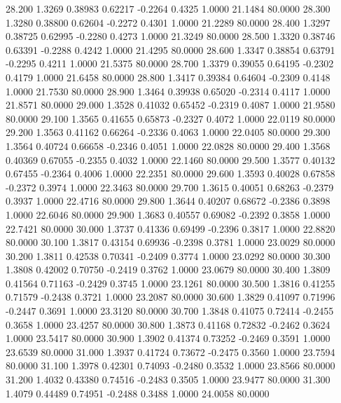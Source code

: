   28.200   1.3269   0.38983   0.62217  -0.2264   0.4325   1.0000  21.1484  80.0000
  28.300   1.3280   0.38800   0.62604  -0.2272   0.4301   1.0000  21.2289  80.0000
  28.400   1.3297   0.38725   0.62995  -0.2280   0.4273   1.0000  21.3249  80.0000
  28.500   1.3320   0.38746   0.63391  -0.2288   0.4242   1.0000  21.4295  80.0000
  28.600   1.3347   0.38854   0.63791  -0.2295   0.4211   1.0000  21.5375  80.0000
  28.700   1.3379   0.39055   0.64195  -0.2302   0.4179   1.0000  21.6458  80.0000
  28.800   1.3417   0.39384   0.64604  -0.2309   0.4148   1.0000  21.7530  80.0000
  28.900   1.3464   0.39938   0.65020  -0.2314   0.4117   1.0000  21.8571  80.0000
  29.000   1.3528   0.41032   0.65452  -0.2319   0.4087   1.0000  21.9580  80.0000
  29.100   1.3565   0.41655   0.65873  -0.2327   0.4072   1.0000  22.0119  80.0000
  29.200   1.3563   0.41162   0.66264  -0.2336   0.4063   1.0000  22.0405  80.0000
  29.300   1.3564   0.40724   0.66658  -0.2346   0.4051   1.0000  22.0828  80.0000
  29.400   1.3568   0.40369   0.67055  -0.2355   0.4032   1.0000  22.1460  80.0000
  29.500   1.3577   0.40132   0.67455  -0.2364   0.4006   1.0000  22.2351  80.0000
  29.600   1.3593   0.40028   0.67858  -0.2372   0.3974   1.0000  22.3463  80.0000
  29.700   1.3615   0.40051   0.68263  -0.2379   0.3937   1.0000  22.4716  80.0000
  29.800   1.3644   0.40207   0.68672  -0.2386   0.3898   1.0000  22.6046  80.0000
  29.900   1.3683   0.40557   0.69082  -0.2392   0.3858   1.0000  22.7421  80.0000
  30.000   1.3737   0.41336   0.69499  -0.2396   0.3817   1.0000  22.8820  80.0000
  30.100   1.3817   0.43154   0.69936  -0.2398   0.3781   1.0000  23.0029  80.0000
  30.200   1.3811   0.42538   0.70341  -0.2409   0.3774   1.0000  23.0292  80.0000
  30.300   1.3808   0.42002   0.70750  -0.2419   0.3762   1.0000  23.0679  80.0000
  30.400   1.3809   0.41564   0.71163  -0.2429   0.3745   1.0000  23.1261  80.0000
  30.500   1.3816   0.41255   0.71579  -0.2438   0.3721   1.0000  23.2087  80.0000
  30.600   1.3829   0.41097   0.71996  -0.2447   0.3691   1.0000  23.3120  80.0000
  30.700   1.3848   0.41075   0.72414  -0.2455   0.3658   1.0000  23.4257  80.0000
  30.800   1.3873   0.41168   0.72832  -0.2462   0.3624   1.0000  23.5417  80.0000
  30.900   1.3902   0.41374   0.73252  -0.2469   0.3591   1.0000  23.6539  80.0000
  31.000   1.3937   0.41724   0.73672  -0.2475   0.3560   1.0000  23.7594  80.0000
  31.100   1.3978   0.42301   0.74093  -0.2480   0.3532   1.0000  23.8566  80.0000
  31.200   1.4032   0.43380   0.74516  -0.2483   0.3505   1.0000  23.9477  80.0000
  31.300   1.4079   0.44489   0.74951  -0.2488   0.3488   1.0000  24.0058  80.0000
